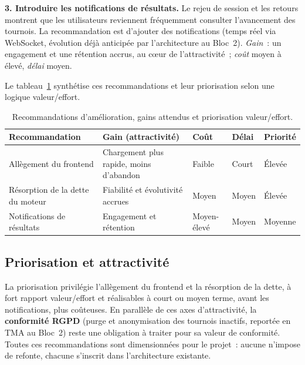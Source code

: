 \textbf{3. Introduire les notifications de résultats.} Le rejeu de session et les retours montrent que les utilisateurs reviennent fréquemment consulter l'avancement des tournois. La recommandation est d'ajouter des notifications (temps réel via WebSocket, évolution déjà anticipée par l'architecture au Bloc~2). \emph{Gain}~: un engagement et une rétention accrus, au cœur de l'attractivité~; \emph{coût} moyen à élevé, \emph{délai} moyen.

Le tableau~\ref{tab:ameliorations} synthétise ces recommandations et leur priorisation selon une logique valeur/effort.

\begin{table}[htbp]
    \centering
    \renewcommand{\arraystretch}{1.3}
    \begin{tabular}{|p{3.8cm}|p{5.2cm}|p{1.8cm}|p{1.8cm}|p{1.6cm}|}
        \hline
        \textbf{Recommandation} & \textbf{Gain (attractivité)} & \textbf{Coût} & \textbf{Délai} & \textbf{Priorité} \\
        \hline
        Allègement du frontend & Chargement plus rapide, moins d'abandon & Faible & Court & Élevée \\
        \hline
        Résorption de la dette du moteur & Fiabilité et évolutivité accrues & Moyen & Moyen & Élevée \\
        \hline
        Notifications de résultats & Engagement et rétention & Moyen-élevé & Moyen & Moyenne \\
        \hline
    \end{tabular}
    \caption{Recommandations d'amélioration, gains attendus et priorisation valeur/effort.}
    \label{tab:ameliorations}
\end{table}

\subsection{Priorisation et attractivité}
La priorisation privilégie l'allègement du frontend et la résorption de la dette, à fort rapport valeur/effort et réalisables à court ou moyen terme, avant les notifications, plus coûteuses. En parallèle de ces axes d'attractivité, la \textbf{conformité RGPD} (purge et anonymisation des tournois inactifs, reportée en TMA au Bloc~2) reste une obligation à traiter pour sa valeur de conformité. Toutes ces recommandations sont dimensionnées pour le projet~: aucune n'impose de refonte, chacune s'inscrit dans l'architecture existante.
